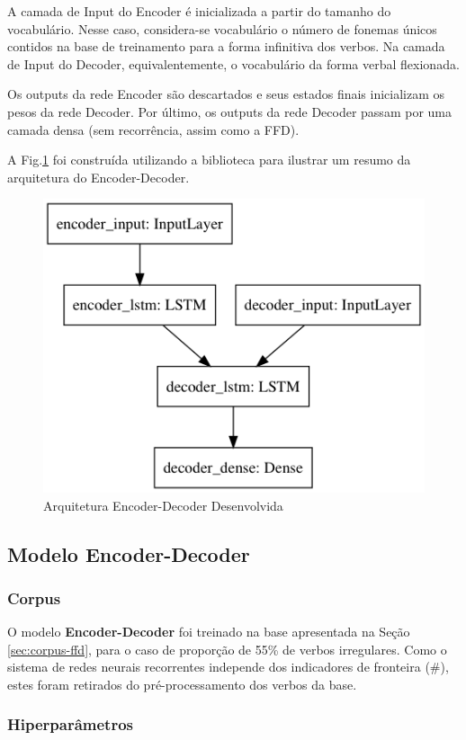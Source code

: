 A camada de Input do Encoder é inicializada a partir do tamanho do vocabulário. Nesse caso, considera-se vocabulário o número de fonemas únicos contidos na base de treinamento para a forma infinitiva dos verbos. Na camada de Input do Decoder, equivalentemente, o vocabulário da forma verbal flexionada.

Os outputs da rede Encoder são descartados e seus estados finais inicializam os pesos da rede Decoder. Por último, os outputs da rede Decoder passam por uma camada densa (sem recorrência, assim como a FFD).

A Fig.\ref{fig:encdec} foi construída utilizando a biblioteca \cite{chollet2015keras} para ilustrar um resumo da arquitetura do Encoder-Decoder.

\begin{figure}[H]
  \centering
  \includegraphics[width=0.5\linewidth]{img/draw-model6.png}
  \caption{Arquitetura Encoder-Decoder Desenvolvida}
  \label{fig:encdec}
\end{figure}

\subsection{Modelo Encoder-Decoder}

\subsubsection{Corpus}
O modelo \textbf{Encoder-Decoder} foi treinado na base apresentada na Seção \ref{sec:corpus-ffd}, para o caso de proporção de 55\% de verbos irregulares. Como o sistema de redes neurais recorrentes independe dos indicadores de fronteira (\#), estes foram retirados do pré-processamento dos verbos da base.

\subsubsection{Hiperparâmetros} 

